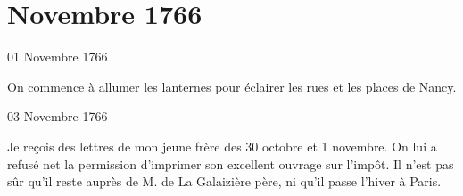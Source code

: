                   \chapter*{Novembre 1766}



                     \begin{diary}{01 Novembre 1766}{}

                         On commence à allumer les lanternes
                           pour
                           éclairer les rues et les places de Nancy.
                        \bigskip


                     \end{diary}

                     \begin{diary}{03 Novembre 1766}{}

                         Je reçois des lettres de mon jeune frère des
                           30 octobre et 1
                              novembre. On lui a refusé net
                           la permission d’imprimer son excellent
                              ouvrage
                              sur l’impôt. Il n’est pas sûr qu’il reste auprès
                           de M. de La Galaizière père, ni qu’il passe
                           l’hiver à Paris. \bigskip


                     \end{diary}

